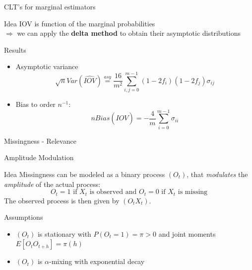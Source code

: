 \documentclass{beamer}
\begin{document}
\begin{frame}{CLT's for marginal estimators}
    \begin{block}{Idea}
        IOV is function of the marginal probabilities \\
        $\Rightarrow$ we can apply the \textbf{delta method}  to obtain their asymptotic distributions 
    \end{block}
    \begin{block}{Results}
        \begin{itemize}
            \item Asymptotic variance 
            \[\sqrt{n}Var(\hat{IOV}) \overset{asy}{=} \frac{16}{m^2}\sum_{i,j = 0}^{m-1} (1 - 2f_i)(1 - 2f_j) \sigma_{ij}\]
            \item Bias to order $n^{-1}$:
            \[n Bias(\hat{IOV}) = -\frac{4}{m} \sum_{i = 0}^{m-1}  \sigma_{ii}\]
        \end{itemize}
    \end{block}
\end{frame}
\begin{frame}{Missingness - Relevance}
    
\end{frame}
\begin{frame}{Amplitude Modulation}
    \begin{block}{Idea}
        Missingness can be modeled as a binary process $(O_t)$, that \textit{modulates} the \textit{amplitude} of the actual process: 
        \[O_t = 1 \text{ if } X_t \text{ is observed and } O_t = 0 \text{ if } X_t \text{ is missing}\] 
        The observed process is then given by $(O_t X_t)$.
    \end{block}
    \begin{block}{Assumptions}
        \begin{itemize}
            \item $(O_t)$ is stationary with $P(O_t = 1) = \pi > 0$ and joint moments $E[O_t O_{t+h}] = \pi(h)$
            \item $(O_t)$ is $\alpha$-mixing with exponential decay
        \end{itemize}
    \end{block}    
\end{frame}
\end{document}
